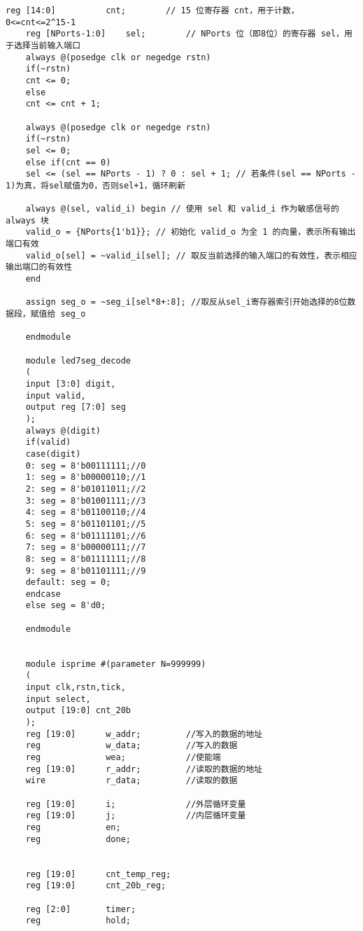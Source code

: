 \begin{lstlisting}[style=verilog]
	reg [14:0]          cnt;        // 15 位寄存器 cnt，用于计数，0<=cnt<=2^15-1
	reg [NPorts-1:0]    sel;        // NPorts 位（即8位）的寄存器 sel，用于选择当前输入端口
	always @(posedge clk or negedge rstn) 
	if(~rstn) 
	cnt <= 0;
	else
	cnt <= cnt + 1;
	
	always @(posedge clk or negedge rstn) 
	if(~rstn)
	sel <= 0;
	else if(cnt == 0)
	sel <= (sel == NPorts - 1) ? 0 : sel + 1; // 若条件(sel == NPorts - 1)为真，将sel赋值为0，否则sel+1，循环刷新
	
	always @(sel, valid_i) begin // 使用 sel 和 valid_i 作为敏感信号的 always 块
	valid_o = {NPorts{1'b1}}; // 初始化 valid_o 为全 1 的向量，表示所有输出端口有效
	valid_o[sel] = ~valid_i[sel]; // 取反当前选择的输入端口的有效性，表示相应输出端口的有效性
	end
	
	assign seg_o = ~seg_i[sel*8+:8]; //取反从sel_i寄存器索引开始选择的8位数据段，赋值给 seg_o
	
	endmodule
	
	module led7seg_decode
	(
	input [3:0] digit,
	input valid,
	output reg [7:0] seg
	);
	always @(digit)
	if(valid)
	case(digit)
	0: seg = 8'b00111111;//0
	1: seg = 8'b00000110;//1
	2: seg = 8'b01011011;//2
	3: seg = 8'b01001111;//3
	4: seg = 8'b01100110;//4
	5: seg = 8'b01101101;//5
	6: seg = 8'b01111101;//6
	7: seg = 8'b00000111;//7
	8: seg = 8'b01111111;//8
	9: seg = 8'b01101111;//9
	default: seg = 0;
	endcase
	else seg = 8'd0;
	
	endmodule
	
	
	module isprime #(parameter N=999999)
	(
	input clk,rstn,tick,
	input select,
	output [19:0] cnt_20b
	);
	reg [19:0]      w_addr;	        //写入的数据的地址
	reg             w_data;	        //写入的数据
	reg             wea;	        //使能端
	reg [19:0]      r_addr;         //读取的数据的地址
	wire            r_data;	        //读取的数据
	
	reg [19:0]      i;              //外层循环变量
	reg [19:0]      j;              //内层循环变量
	reg             en;
	reg             done;
	
	
	reg [19:0]      cnt_temp_reg;
	reg [19:0]      cnt_20b_reg;
	
	reg [2:0]       timer;
	reg             hold;
	

\end{lstlisting}

